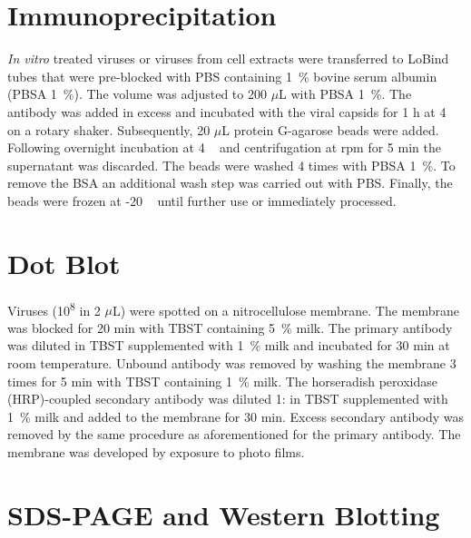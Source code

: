\section{Immunoprecipitation}
\textit{In vitro} treated viruses or viruses from cell extracts were transferred to LoBind tubes that were pre-blocked with PBS containing 1~\% bovine serum albumin (PBSA 1~\%). The volume was adjusted to 200 $\mu$L with PBSA 1~\%. The antibody was added in excess and incubated with the viral capsids for 1 h at 4 \textcelsius~ on a rotary shaker. Subsequently, 20 $\mu$L protein G-agarose beads were added. Following overnight incubation at 4 \textcelsius~ and centrifugation at  rpm for 5 min the supernatant was discarded. The beads were washed 4 times with PBSA 1~\%. To remove the BSA an additional wash step was carried out with PBS. Finally, the beads were frozen at -20 \textcelsius~ until further use or immediately processed. 


\section{Dot Blot}
Viruses (10\textsuperscript{8} in 2 $\mu$L) were spotted on a nitrocellulose membrane. The membrane was blocked for 20 min with TBST containing 5~\% milk. The primary antibody was diluted in TBST supplemented with 1~\% milk and incubated for 30 min at room temperature. Unbound antibody was removed by washing the membrane 3 times for 5 min with TBST containing 1~\% milk. The horseradish peroxidase (HRP)-coupled secondary antibody was diluted 1: in TBST supplemented with 1~\% milk and added to the membrane for 30 min. Excess secondary antibody was removed by the same procedure as aforementioned for the primary antibody. The membrane was developed by exposure to photo films.    


\section{SDS-PAGE and Western Blotting}

